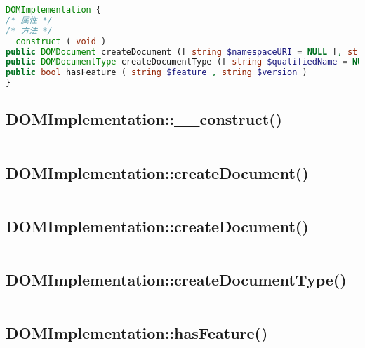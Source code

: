 \begin{lstlisting}[language=PHP]
DOMImplementation {
/* 属性 */
/* 方法 */
__construct ( void )
public DOMDocument createDocument ([ string $namespaceURI = NULL [, string $qualifiedName = NULL [, DOMDocumentType $doctype = NULL ]]] )
public DOMDocumentType createDocumentType ([ string $qualifiedName = NULL [, string $publicId = NULL [, string $systemId = NULL ]]] )
public bool hasFeature ( string $feature , string $version )
}
\end{lstlisting}

\subsection{DOMImplementation::\_\_construct()}


\begin{lstlisting}[language=PHP]

\end{lstlisting}

\subsection{DOMImplementation::createDocument()}


\begin{lstlisting}[language=PHP]

\end{lstlisting}


\subsection{DOMImplementation::createDocument()}



\begin{lstlisting}[language=PHP]

\end{lstlisting}


\subsection{DOMImplementation::createDocumentType()}



\begin{lstlisting}[language=PHP]

\end{lstlisting}


\subsection{DOMImplementation::hasFeature()}



